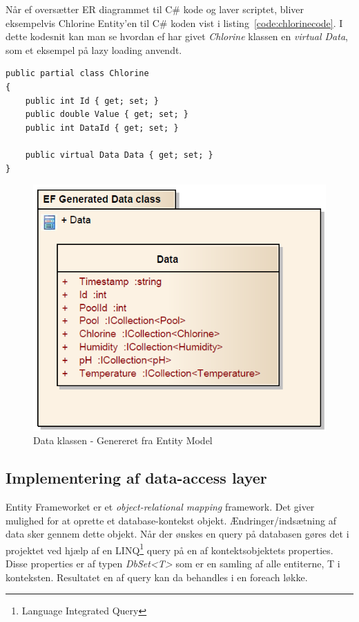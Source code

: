 Når \gls{ef} oversætter ER diagrammet til C\# kode og laver scriptet, bliver eksempelvis Chlorine Entity'en til C\# koden vist i listing~\ref{code:chlorinecode}. I dette kodesnit kan man se hvordan \gls{ef} har givet \textit{Chlorine} klassen en \textit{virtual Data}, som et eksempel på lazy loading anvendt.

\begin{minipage}[h]{\linewidth}
\begin{lstlisting}[caption=C\# kode repræsentationen af Chlorine entity.,label=code:chlorinecode]
public partial class Chlorine
{
	public int Id { get; set; }
	public double Value { get; set; }
	public int DataId { get; set; }
	
	public virtual Data Data { get; set; }
}
\end{lstlisting}
\end{minipage}

\begin{figure}
	\centering
	\includegraphics[width=0.5\linewidth]{figs/implementering/efGeneratedData.PNG}
	\caption{Data klassen - Genereret fra Entity Model}
	\label{fig:efGeneratedData}
\end{figure}

\subsection{Implementering af data-access layer}

Entity Frameworket er et \textit{object-relational mapping} framework. Det giver mulighed for at oprette et database-kontekst objekt. Ændringer/indsætning af data sker gennem dette objekt. Når der ønskes en query på databasen gøres det i projektet ved hjælp af en LINQ\footnote{Language Integrated Query} query på en af kontektsobjektets properties. Disse properties er af typen \textit{DbSet<T>} som er en samling af alle entiterne, T i konteksten. Resultatet en af query kan da behandles i en foreach løkke.

